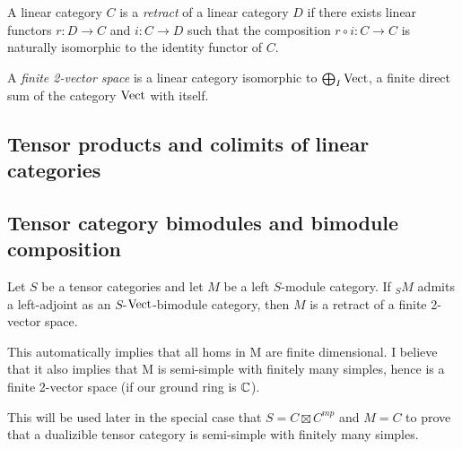 \documentclass{amsart}
\begin{document}
\begin{definition}
	A linear category $C$ is a {\em retract} of a linear category $D$ if there exists linear functors $r: D \to C$ and $i: C \to D$ such that the composition $r \circ i: C \to C$ is naturally isomorphic to the identity functor of $C$. 
\end{definition}

\begin{definition}
	A {\em finite 2-vector space} is a linear category isomorphic to $\bigoplus_I \mathrm{Vect}$,
	 a finite direct sum of the category $\mathrm{Vect}$ with itself. 
\end{definition}

\subsection{Tensor products and colimits of linear categories}

\subsection{Tensor category bimodules and bimodule composition}


\begin{proposition}
	Let $S$ be a tensor categories and let $M$ be a left $S$-module category.  If ${}_S M$ admits a left-adjoint as an $S$-$\mathrm{Vect}$-bimodule category, then $M$ is a retract of a finite 2-vector space. 
\end{proposition}

{\color{CSPcolor} This automatically implies that all homs in M are finite dimensional. I believe that it also implies that M is semi-simple with finitely many simples, hence is a finite 2-vector space (if our ground ring is $\mathbb C$).

This will be used later in the special case that $S = C \boxtimes C^{mp}$ and $M=C$ to prove that a dualizible tensor category is semi-simple with finitely many simples.}
\end{document}
